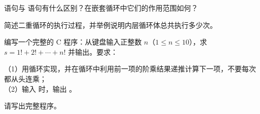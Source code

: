 \documentclass[a4paper,11pt]{article}
\begin{document}
\q {} 语句与  语句有什么区别？在嵌套循环中它们的作用范围如何？\anslines{3.2cm}

\q 简述二重循环的执行过程，并举例说明内层循环体总共执行多少次。\anslines{3.2cm}

\newpage
{}

\q 编写一个完整的 C 程序：从键盘输入正整数 $n$（$1\le n\le 10$），求 $s = 1! + 2! + \cdots + n!$ 并输出。要求：
\par\vspace{0.15em}
\noindent（1）用循环实现，并在循环中利用前一项的阶乘结果递推计算下一项，不要每次都从头连乘；\\
\noindent（2）输入  时，输出 。

\noindent 请写出完整程序。\anslines{4.0cm}
\end{document}
